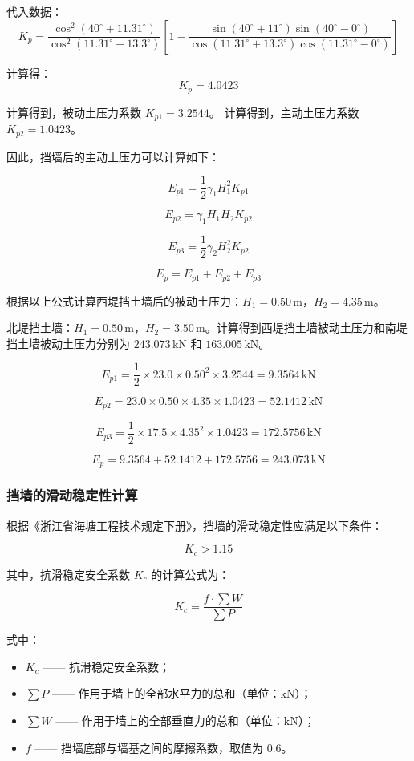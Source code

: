 \documentclass[UTF8, a4paper, 12pt]{ctexart} %
\begin{document}
代入数据：
\[
K_p = \frac{\cos^2 \left( 40^\circ + 11.31^\circ \right)}{\cos^2 \left( 11.31^\circ - 13.3^\circ \right)} 
\left[ 
1 - \frac{\sin \left( 40^\circ + 11^\circ \right) \sin \left( 40^\circ - 0^\circ \right)}{\cos \left( 11.31^\circ + 13.3^\circ \right) \cos \left( 11.31^\circ - 0^\circ \right)}
\right]
\]

计算得：
\[
K_p = 4.0423
\]

计算得到，被动土压力系数 $K_{p1} = 3.2544$。 计算得到，主动土压力系数 $K_{p2} = 1.0423$。

因此，挡墙后的主动土压力可以计算如下：

\[
E_{p1} = \frac{1}{2} \gamma_1 H_1^2 K_{p1} 
\]

\[
E_{p2} = \gamma_1 H_1 H_2 K_{p2} 
\]

\[
E_{p3} = \frac{1}{2} \gamma_2 H_2^2 K_{p2} 
\]

\[
E_p = E_{p1} + E_{p2} + E_{p3} 
\]

根据以上公式计算西堤挡土墙后的被动土压力：$H_1 = 0.50\,\text{m}$，$H_2 = 4.35\,\text{m}$。

北堤挡土墙：$H_1 = 0.50\,\text{m}$，$H_2 = 3.50\,\text{m}$。计算得到西堤挡土墙被动土压力和南堤挡土墙被动土压力分别为 $243.073\,\text{kN}$ 和 $163.005\,\text{kN}$。

\[
E_{p1} = \frac{1}{2} \times 23.0 \times 0.50^2 \times 3.2544 = 9.3564\,\text{kN}
\]

\[
E_{p2} = 23.0 \times 0.50 \times 4.35 \times 1.0423 = 52.1412\,\text{kN}
\]

\[
E_{p3} = \frac{1}{2} \times 17.5 \times 4.35^2 \times 1.0423 = 172.5756\,\text{kN}
\]

\[
E_p = 9.3564 + 52.1412 + 172.5756 = 243.073\,\text{kN}
\]
\subsubsection{挡墙的滑动稳定性计算}

根据《浙江省海塘工程技术规定下册》，挡墙的滑动稳定性应满足以下条件：

\[
K_c > 1.15
\]

其中，抗滑稳定安全系数 $K_c$ 的计算公式为：

\begin{equation}
    K_c = \frac{f \cdot \sum W}{\sum P}
\end{equation}

式中：
\begin{itemize}
    \item $K_c$ —— 抗滑稳定安全系数；
    \item $\sum P$ —— 作用于墙上的全部水平力的总和（单位：$\text{kN}$）；
    \item $\sum W$ —— 作用于墙上的全部垂直力的总和（单位：$\text{kN}$）；
    \item $f$ —— 挡墙底部与墙基之间的摩擦系数，取值为 $0.6$。
\end{itemize}
\end{document}
